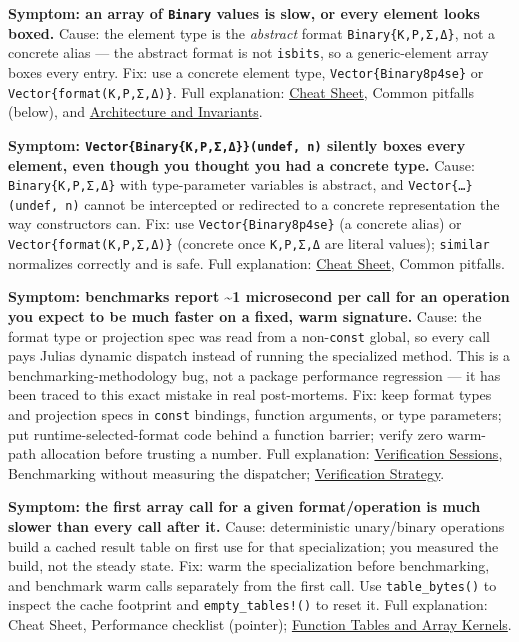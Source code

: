 \label{15207003463717874679}{}


\textbf{Symptom: an array of \texttt{Binary} values is slow, or every element looks boxed.} Cause: the element type is the \emph{abstract} format \texttt{Binary\{K,P,Σ,Δ\}}, not a concrete alias — the abstract format is not \texttt{isbits}, so a generic-element array boxes every entry. Fix: use a concrete element type, \texttt{Vector\{Binary8p4se\}} or \texttt{Vector\{format(K,P,Σ,Δ)\}}. Full explanation: \href{help\_\allowbreak{}cheat\_\allowbreak{}sheet.md}{Cheat Sheet}, Common pitfalls (below), and \href{internals\_\allowbreak{}architecture.md}{Architecture and Invariants}.



\textbf{Symptom: \texttt{Vector\{Binary\{K,P,Σ,Δ\}\}(undef, n)} silently boxes every element, even though you thought you had a concrete type.} Cause: \texttt{Binary\{K,P,Σ,Δ\}} with type-parameter variables is abstract, and \texttt{Vector\{…\}(undef, n)} cannot be intercepted or redirected to a concrete representation the way constructors can. Fix: use \texttt{Vector\{Binary8p4se\}} (a concrete alias) or \texttt{Vector\{format(K,P,Σ,Δ)\}} (concrete once \texttt{K,P,Σ,Δ} are literal values); \texttt{similar} normalizes correctly and is safe. Full explanation: \href{help\_\allowbreak{}cheat\_\allowbreak{}sheet.md}{Cheat Sheet}, Common pitfalls.



\textbf{Symptom: benchmarks report {\textasciitilde}1 microsecond per call for an operation you expect to be much faster on a fixed, warm signature.} Cause: the format type or projection spec was read from a non-\texttt{const} global, so every call pays Julia{\textquotesingle}s dynamic dispatch instead of running the specialized method. This is a benchmarking-methodology bug, not a package performance regression — it has been traced to this exact mistake in real post-mortems. Fix: keep format types and projection specs in \texttt{const} bindings, function arguments, or type parameters; put runtime-selected-format code behind a function barrier; verify zero warm-path allocation before trusting a number. Full explanation: \href{examples\_\allowbreak{}verification.md}{Verification Sessions}, Benchmarking without measuring the dispatcher; \href{internals\_\allowbreak{}verification.md}{Verification Strategy}.



\textbf{Symptom: the first array call for a given format/operation is much slower than every call after it.} Cause: deterministic unary/binary operations build a cached result table on first use for that specialization; you measured the build, not the steady state. Fix: warm the specialization before benchmarking, and benchmark warm calls separately from the first call. Use \texttt{table\_\allowbreak{}bytes()} to inspect the cache footprint and \texttt{empty\_\allowbreak{}tables!()} to reset it. Full explanation: Cheat Sheet, Performance checklist (pointer); \href{internals\_\allowbreak{}tables.md}{Function Tables and Array Kernels}.



